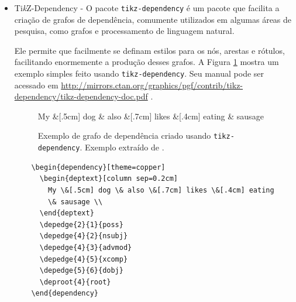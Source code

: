 \begin{itemize}
\begin{bclogo}[
	couleur=bgblue,
	arrondi=0,
	logo=\faBeer,%
	barre=none,
	noborder=true]{Você Sabia?}
	Você sabia que o consumo moderado de cerveja aumenta a densidade dos ossos em humanos? Um outro estudo mostrou que bebedores moderados têm um menor risco de doenças cardiovasculares do que os abstêmios!
\end{bclogo}

O manual do pacote \texttt{bclogo} (em Francês) pode ser acessado em 
 \url{http://mirrors.ctan.org/graphics/bclogo/doc/bclogo-doc.pdf} \parencite{bclogo}.

\item Ti\textit{k}Z-Dependency - O pacote \texttt{tikz-dependency} é um pacote que facilita a criação de grafos de dependência, comumente utilizados em algumas áreas de pesquisa, como grafos e processamento de linguagem natural. 

Ele permite que facilmente se definam estilos para os nós, arestas e rótulos, facilitando enormemente a produção desses grafos. A Figura \ref{fig:grafdep} mostra um exemplo simples feito usando \texttt{tikz-dependency}. Seu manual pode ser acessado em \url{http://mirrors.ctan.org/graphics/pgf/contrib/tikz-dependency/tikz-dependency-doc.pdf} \parencite{tikz-dependency}.

\begin{figure}[htb]
	\begin{center}
	\begin{dependency}[theme=copper]
		\begin{deptext}[column sep=0.2cm]
			My \&[.5cm] dog \& also \&[.7cm] likes \&[.4cm] eating \& sausage \\
		\end{deptext}
	\end{dependency}
	\end{center}
	\caption{Exemplo de grafo de dependência criado usando \texttt{tikz-dependency}. Exemplo extraído de \parencite{tikz-dependency}.}
	\label{fig:grafdep}
\end{figure}

\begin{listing}[ht]
	\begin{verbatim}
	\begin{dependency}[theme=copper]
	  \begin{deptext}[column sep=0.2cm]
	    My \&[.5cm] dog \& also \&[.7cm] likes \&[.4cm] eating 
	    \& sausage \\
	  \end{deptext}
	  \depedge{2}{1}{poss}
	  \depedge{4}{2}{nsubj}
	  \depedge{4}{3}{advmod}
	  \depedge{4}{5}{xcomp}
	  \depedge{5}{6}{dobj}
	  \deproot{4}{root}
	\end{dependency}
	\end{verbatim}
	\caption{Código \LaTeX{} usado para gerar exemplo de gráfico da Figura \ref{fig:grafdep} usando a biblioteca definida pelo pacote \texttt{tikz-dependency}.}
	\label{cod:cod-grafdep}
\end{listing}


\end{itemize}

